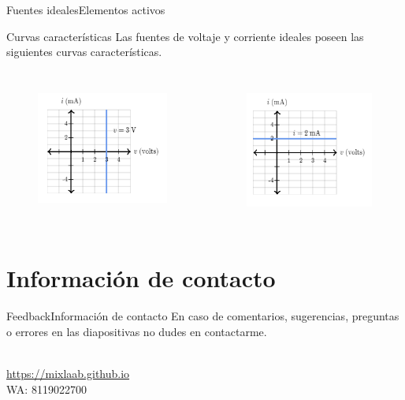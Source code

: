 \documentclass[10pt]{beamer}
\newcommand{\chref}[2]{%
  \href{#1}{{\usebeamercolor[bg]{Aalborg}#2}}%
}
\begin{document}
\begin{frame}{Fuentes ideales}{Elementos activos}
\begin{block}{Curvas características}
Las fuentes de voltaje y corriente ideales poseen las siguientes curvas características.

\end{block}
\begin{columns}[c]
    \column{1.2in}
\begin{figure}[h!]
\centering
\includegraphics [scale=0.6]{constvolt}
\label{fig:first}
\end{figure}

    \column{1.2in}
\begin{figure}[h!]
\centering
\includegraphics [scale=0.6]{constcurr}
\label{fig:first}
\end{figure}
\end{columns}

\end{frame}

\section{Información de contacto}
\begin{frame}{Feedback}{Información de contacto}
En caso de comentarios, sugerencias, preguntas o errores en las diapositivas no dudes en contactarme.
  \begin{center}
    \insertauthor\\
    \chref{https://mixlaab.github.io}{https://mixlaab.github.io}\\
    WA: 8119022700\\
  \end{center}
\end{frame}

{\aauwavesbg%
\begin{frame}%
\end{frame}}
\end{document}
